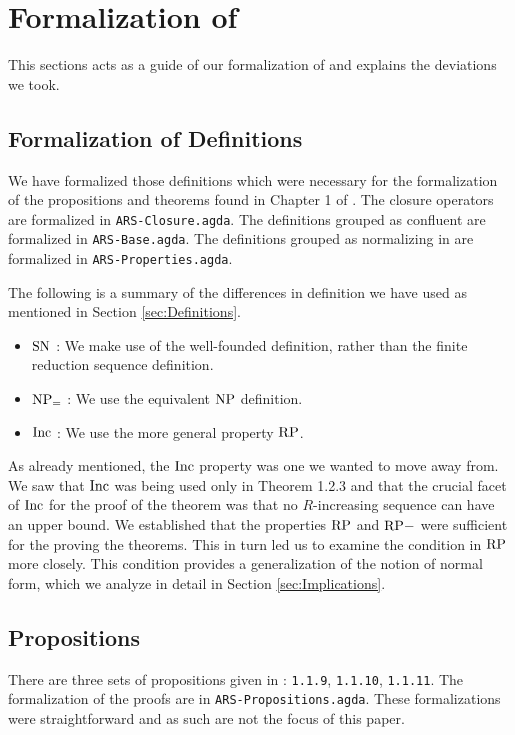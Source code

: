 \section{Formalization of \terese}
\label{sec:Formalization}
This sections acts as a guide of our formalization of \terese and explains the deviations we took.  

\subsection{Formalization of Definitions}\label{subsec:def}
We have formalized those definitions which were necessary for the formalization of the propositions and theorems found 
in Chapter 1 of \terese. 
The closure operators are formalized in \texttt{ARS-Closure.agda}. 
The definitions grouped as confluent \terese are formalized in \texttt{ARS-Base.agda}. 
The definitions grouped as normalizing in \terese are formalized in \texttt{ARS-Properties.agda}.  

The following is a summary of the differences in definition we have used as mentioned in Section \ref{sec:Definitions}. 
\begin{itemize}
    \item $\mathrm{SN}$ : We make use of the well-founded definition, rather than the finite reduction sequence definition.
    \item $\mathrm{NP_=}$ : We use the equivalent $\mathrm{NP}$ definition. 
    \item $\mathrm{Inc}$ : We use the more general property $\mathrm{RP}$.      
\end{itemize}

As already mentioned, the $\mathrm{Inc}$ property was one we wanted to move away from. We saw that $\mathrm{Inc}$ was being used only in Theorem 1.2.3 
and that the crucial facet of $\mathrm{Inc}$ for the proof of the theorem was that no $R$-increasing 
sequence can have an upper bound.
We established that the properties $\mathrm{RP}$ and $\mathrm{RP-}$ were sufficient for the proving the theorems. This in turn led us to 
examine the condition in $\mathrm{RP}$ more closely. This condition provides a generalization of the notion of normal form, 
which we analyze in detail in Section \ref{sec:Implications}. 

\subsection{Propositions}
There are three sets of propositions given in \terese: \texttt{1.1.9}, \texttt{1.1.10}, \texttt{1.1.11}. 
The formalization of the proofs are in \texttt{ARS-Propositions.agda}. These formalizations were straightforward 
and as such are not the focus of this paper. 


